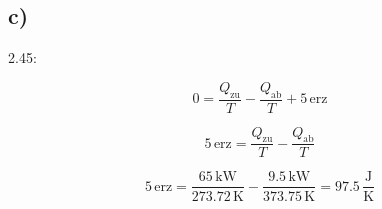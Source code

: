 

\subsection*{c)}
2.45:

\[
0 = \frac{Q_{\text{zu}}}{T} - \frac{Q_{\text{ab}}}{T} + 5 \, \text{erz}
\]

\[
5 \, \text{erz} = \frac{Q_{\text{zu}}}{T} - \frac{Q_{\text{ab}}}{T}
\]

\[
5 \, \text{erz} = \frac{65 \, \text{kW}}{273.72 \, \text{K}} - \frac{9.5 \, \text{kW}}{373.75 \, \text{K}} = 97.5 \, \frac{\text{J}}{\text{K}}
\]